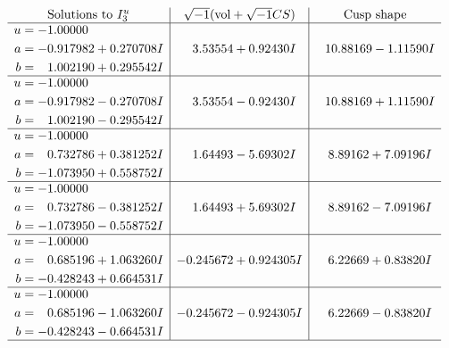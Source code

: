 \documentclass[1p]{elsarticle_modified}
\theoremstyle{definition}
\newcommand{\I}{\sqrt{-1}}
\begin{document}
$$\begin{array}{c|c|c}  
\text{Solutions to }I^u_{3}& \I (\text{vol} + \sqrt{-1}CS) & \text{Cusp shape}\\
 \hline 
\begin{aligned}
u &= -1.00000\phantom{ +0.000000I} \\
a &= -0.917982 + 0.270708 I \\
b &= \phantom{-}1.002190 + 0.295542 I\end{aligned}
 & \phantom{-}3.53554 + 0.92430 I & \phantom{-}10.88169 - 1.11590 I \\ \hline\begin{aligned}
u &= -1.00000\phantom{ +0.000000I} \\
a &= -0.917982 - 0.270708 I \\
b &= \phantom{-}1.002190 - 0.295542 I\end{aligned}
 & \phantom{-}3.53554 - 0.92430 I & \phantom{-}10.88169 + 1.11590 I \\ \hline\begin{aligned}
u &= -1.00000\phantom{ +0.000000I} \\
a &= \phantom{-}0.732786 + 0.381252 I \\
b &= -1.073950 + 0.558752 I\end{aligned}
 & \phantom{-}1.64493 - 5.69302 I & \phantom{-}8.89162 + 7.09196 I \\ \hline\begin{aligned}
u &= -1.00000\phantom{ +0.000000I} \\
a &= \phantom{-}0.732786 - 0.381252 I \\
b &= -1.073950 - 0.558752 I\end{aligned}
 & \phantom{-}1.64493 + 5.69302 I & \phantom{-}8.89162 - 7.09196 I \\ \hline\begin{aligned}
u &= -1.00000\phantom{ +0.000000I} \\
a &= \phantom{-}0.685196 + 1.063260 I \\
b &= -0.428243 + 0.664531 I\end{aligned}
 & -0.245672 + 0.924305 I & \phantom{-}6.22669 + 0.83820 I \\ \hline\begin{aligned}
u &= -1.00000\phantom{ +0.000000I} \\
a &= \phantom{-}0.685196 - 1.063260 I \\
b &= -0.428243 - 0.664531 I\end{aligned}
 & -0.245672 - 0.924305 I & \phantom{-}6.22669 - 0.83820 I\\
 \hline 
 \end{array}$$\newpage
\end{document}
